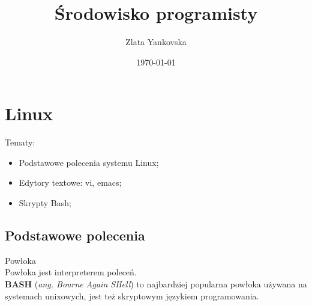 \documentclass[11pt, a4paper, onecolumn, twoside]{report}
\title{Środowisko programisty}
\author{Zlata Yankovska}
\date{\today}
\begin{document}
\begin{titlepage}
\maketitle
\end{titlepage}

\tableofcontents

\chapter{Linux}

\Large Tematy: \\
\begin{itemize}
\item Podstawowe polecenia systemu Linux;
\item Edytory textowe: vi, emacs;
\item Skrypty Bash;
\end{itemize}

\section{Podstawowe polecenia}
\Large Powłoka\\
\normalsize Powłoka jest interpreterem poleceń.\\
\textbf{BASH} (\textit{ang. Bourne Again SHell}) to najbardziej popularna powłoka używana na systemach unixowych, jest też skryptowym językiem programowania.~\cite{bash}\\
\end{document}
